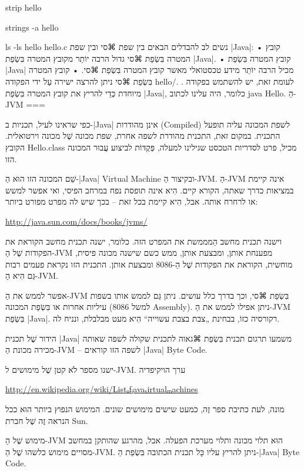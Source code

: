 strip hello
\END

strings -a hello
\END

ls -ls hello hello.c
\END
נשים לב להבדלים הבאים בין שפת ⌘סי ובין שפת \E|Java|:
• קובץ המטרה בִּשְׂפַת ⌘סי גדול הרבה יוֹתֵר מקובץ המטרה בִּשְׂפַת
|Java|.
• קובץ המטרה בִּשְׂפַת \E|Java| מכיל הרבה יוֹתֵר מידע טכסטואלי מאשר קובץ
המטרה בִּשְׂפַת ⌘סי.
• קובץ המטרה בִּשְׂפַת ⌘סי ניתן להרצה ישירה עַל ידי הפקודה hello/.
. לעומת זאת, יש להשתמש בפקודה מיוחדת כְּדֵי להריץ את קובץ המטרה
בִּשְׂפַת \E|Java|, כלומר, היה עלינו לכתוב java Hello.
הַ-JVM
===

כפי שראינו לעיל, תכניות ב-|Java| אינן מהודרות (Compiled) לשפת המכונה עליה
תופעל התכנית. במקום זאת, התכנית מהודרת לשפה אחרת, שפת מכונה שֶׁל
מכונה וירטואלית. הקובץ Hello.class מכיל, פרט לסדריות הטכסט שגילינו למעלה,
פְּקֻדּוֹת לביצוע עֲבוּר המכונה הזו.

שֵׁם המכונה הזו הוּא הַ-|Java| Virtual Machine ובקיצור הַ-JVM. הַ-JVM אינה
קיימת במציאות כדרך שאתה, הקורא קיים. הִיא אינה תופסת נפח במרחב הפיסי, ואי אפשר
למשש או לרחרח אותה. אבל, הִיא קיימת בכל זאת – בכך שיש לה מפרט מפורט ביותר:
\begin{english}
\url{http://java.sun.com/docs/books/jvms/}
\end{english}

וישנה תכנית מחשב הַמממשת את המפרט הזה. כלומר, ישנה תכנית מחשב הקוראת
את הפקודות שֶׁל הַ-JVM מפענחת אותן, ומבצעת אותן, ממש כשם שישנה מכונה פיסית,
מוחשית, הקוראת את הפקודות שֶׁל הַ-8086 ומבצעת אותן. התכנית הזו נקראת
פעמים רבות גַּם הִיא הַ-JVM.

אפשר לממש את הַ-JVM בִּשְׂפַת ⌘סי, וכך בדרך כלל עושים. ניתן גַּם לממש אותו
בשפות עיליות אחרות או בִּשְׂפַת המכונה (למשל 8086 Assembly). ניתן אפילו לממש
את הַ-JVM בִּשְׂפַת \E|Java|. רקורסיה כזוֹ, בבחינת „צבת בצבת עשוייה“ הִיא מעט
מבלבלת, ונניח לה.

הידור שֶׁל תכנית \E|Java| משמעו תרגום תכנית בִּשְׂפַת ⌘גאוה לתכנית שקולה
לשפה שאותה מכירה מכונת הַ-JVM – לשפה הזו קוראים \E|Java| Byte Code.

ישנו מספר לֹא קטן שֶׁל מימושים ל-JVM. ערך הויקיפדיה
\begin{english}
\url{http://en.wikipedia.org/wiki/Listₒfⱼavaᵥirtualₘachines}
\end{english}

מונה, לעת כתיבת ספר זֶה, כמעט שישים מימושים שונים. המימוש הנפוץ ביותר הוּא ככל
הנראה זֶה שֶׁל חברת Sun.

מימוש שֶׁל הַ-JVM הוּא תלוי מכונה ותלוי מערכת הפעלה. אבל, מהרגע שהותקן במחשב
מסויים מימוש כלשהו שֶׁל הַ-JVM. ניתן להריץ עליו כָּל תכנית הכתובה
בִּשְׂפַת הַ-|Java| Byte Code.

